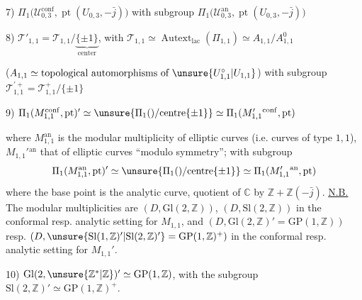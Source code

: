 
7) $\Pi_1\bigl(\mathcal U_{0,3}^{\mathrm{conf}},\operatorname{pt}(U_{0,3},-\bar j)\bigr)$
with subgroup $\Pi_1\bigl(\mathcal U_{0,3}^{\mathrm{an}},\operatorname{pt}(U_{0,3},-\bar j)\bigr)$


8) $\mathcal T'_{1,1}=\mathcal T_{1,1}/\underbrace{\{\pm1\}}_{\text{center}}$,
with $\mathcal T_{1,1}\simeq\operatorname{Autext}_{\mathrm{lac}}(\Pi_{1,1})
\simeq A_{1,1}/A_{1,1}^{0}$

($A_{1,1}\simeq\text{topological automorphisms of }\unsure{U_{1,1}^{\circ}|U_{1,1}}$)
with subgroup $\mathcal T_{1,1}^{\prime+}=\mathcal T_{1,1}^{+}/\{\pm1\}$


9) $\Pi_1(M_{1,1}^{\mathrm{conf}},\mathrm{pt})' \simeq \unsure{\Pi_1()/\mathrm{centre}\{\pm1\}} \simeq \Pi_1(M_{1,1}'{}^{\mathrm{conf}},\mathrm{pt})$

where $M_{1,1}^{\mathrm{an}}$ is the  modular multiplicity of  elliptic curves (i.e.  curves of type $1,1$), $M_{1,1}'{}^{\mathrm{an}}$ that of  elliptic curves ``modulo symmetry''; with subgroup
\[
\Pi_1(M_{1,1}^{\mathrm{an}},\mathrm{pt})' \simeq \unsure{\Pi_1()/\mathrm{centre}\{\pm1\}} \simeq \Pi_1(M_{1,1}'{}^{\mathrm{an}},\mathrm{pt})
\]
where the base point is the  analytic curve, quotient of $\mathbb C$ by $\mathbb Z+\mathbb Z(-\bar j)$. \uline{N.B.} The modular multiplicities are $(D,\mathrm{Gl}(2,\mathbb Z))$, $(D,\mathrm{Sl}(2,\mathbb Z))$ in the  conformal resp. analytic setting for $M_{1,1}$, and $(D,\mathrm{Gl}(2,\mathbb Z)'=\mathrm{GP}(1,\mathbb Z))$ resp. $(D,\unsure{\mathrm{Sl}(1,\mathbb Z)'|\mathrm{Sl}(2,\mathbb Z)'}=\mathrm{GP}(1,\mathbb Z)^+)$ in the conformal resp. analytic setting for $M_{1,1}'$.

10) $\mathrm{Gl}(2,\unsure{\mathbb Z^{\ast}|\mathbb Z})' \simeq \mathrm{GP}(1,\mathbb Z)$, with the subgroup $\mathrm{Sl}(2,\mathbb Z)'\simeq\mathrm{GP}(1,\mathbb Z)^+$.

